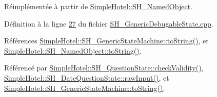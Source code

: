 Réimplémentée à partir de \hyperlink{classSimpleHotel_1_1SH__NamedObject_ab6e289aeff50c3fb0f30156c68b1e808}{Simple\-Hotel\-::\-S\-H\-\_\-\-Named\-Object}.



Définition à la ligne \hyperlink{SH__GenericDebugableState_8cpp_source_l00027}{27} du fichier \hyperlink{SH__GenericDebugableState_8cpp_source}{S\-H\-\_\-\-Generic\-Debugable\-State.\-cpp}.



Références \hyperlink{classSimpleHotel_1_1SH__GenericStateMachine_ad6dd1d0986c40684410ed94f1f610b12}{Simple\-Hotel\-::\-S\-H\-\_\-\-Generic\-State\-Machine\-::to\-String()}, et \hyperlink{classSimpleHotel_1_1SH__NamedObject_ab6e289aeff50c3fb0f30156c68b1e808}{Simple\-Hotel\-::\-S\-H\-\_\-\-Named\-Object\-::to\-String()}.



Référencé par \hyperlink{classSimpleHotel_1_1SH__QuestionState_a0fd7e76443cfd6f0329b085358e30355}{Simple\-Hotel\-::\-S\-H\-\_\-\-Question\-State\-::check\-Validity()}, \hyperlink{classSimpleHotel_1_1SH__DateQuestionState_adb8becb2b3f9c9c38da757dbcea95554}{Simple\-Hotel\-::\-S\-H\-\_\-\-Date\-Question\-State\-::raw\-Input()}, et \hyperlink{classSimpleHotel_1_1SH__GenericStateMachine_ad6dd1d0986c40684410ed94f1f610b12}{Simple\-Hotel\-::\-S\-H\-\_\-\-Generic\-State\-Machine\-::to\-String()}.


